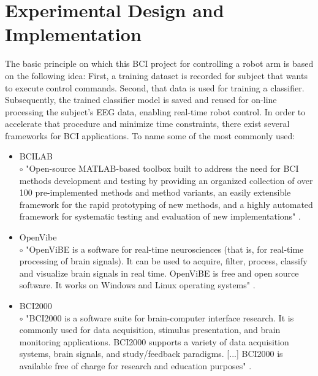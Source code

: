 \documentclass[a4paper,oneside, openright,12pt]{report}
\begin{document}
\chapter{Experimental Design and Implementation}
The basic principle on which this BCI project for controlling a robot arm is based on the following idea: First, a training dataset is recorded for subject that wants to execute control commands. Second, that data is used for training a classifier. Subsequently, the trained classifier model is saved and reused for on-line processing the subject's EEG data, enabling real-time robot control. In order to accelerate that procedure and minimize time constraints, there exist several frameworks for BCI applications. To name some of the most commonly used:
\begin{itemize}
	\item BCILAB\\
	$\circ$  "Open-source MATLAB-based toolbox built to address the need for BCI methods development and testing by providing an organized collection of over 100 pre-implemented methods and method variants, an easily extensible framework for the rapid prototyping of new methods, and a highly automated framework for systematic testing and evaluation of new implementations" \cite{kothe2013bcilab}.
	\item OpenVibe\\
	$\circ$ "OpenViBE is a software for real-time neurosciences (that is, for real-time processing of brain signals). It can be used to acquire, filter, process, classify and visualize brain signals in real time. OpenViBE is free and open source software. It works on Windows and Linux operating systems" \cite{journals/presence/RenardLGCMDBL10}.
	\item BCI2000\\
	$\circ$ "BCI2000 is a software suite for brain-computer interface research. It is commonly used for data acquisition, stimulus presentation, and brain monitoring applications. BCI2000 supports a variety of data acquisition systems, brain signals, and study/feedback paradigms. [...] BCI2000 is available free of charge for research and education purposes" \cite{schalk2010practical}.
\end{itemize}
\end{document}
